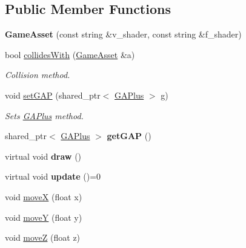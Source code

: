 \subsection*{Public Member Functions}
\begin{DoxyCompactItemize}
\item 
\hypertarget{classGameAsset_ac6d2340f41dd95e71892327dae4e1585}{{\bfseries Game\-Asset} (const string \&v\-\_\-shader, const string \&f\-\_\-shader)}\label{classGameAsset_ac6d2340f41dd95e71892327dae4e1585}

\item 
bool \hyperlink{classGameAsset_a612793ce2a354d2f8839a779d0ca2227}{collides\-With} (\hyperlink{classGameAsset}{Game\-Asset} \&a)
\begin{DoxyCompactList}\small\item\em Collision method. \end{DoxyCompactList}\item 
void \hyperlink{classGameAsset_aa4e2e9faf5cc690677549cbaf30ab80a}{set\-G\-A\-P} (shared\-\_\-ptr$<$ \hyperlink{classGAPlus}{G\-A\-Plus} $>$ g)
\begin{DoxyCompactList}\small\item\em Sets \hyperlink{classGAPlus}{G\-A\-Plus} method. \end{DoxyCompactList}\item 
\hypertarget{classGameAsset_a4d64bc9652249a4d5512b52432b8154a}{shared\-\_\-ptr$<$ \hyperlink{classGAPlus}{G\-A\-Plus} $>$ {\bfseries get\-G\-A\-P} ()}\label{classGameAsset_a4d64bc9652249a4d5512b52432b8154a}

\item 
\hypertarget{classGameAsset_a2d7e18a8f1dd8ba89ed1bd14f2affeab}{virtual void {\bfseries draw} ()}\label{classGameAsset_a2d7e18a8f1dd8ba89ed1bd14f2affeab}

\item 
\hypertarget{classGameAsset_a42688ec8f02e201eaaa01e74a112083f}{virtual void {\bfseries update} ()=0}\label{classGameAsset_a42688ec8f02e201eaaa01e74a112083f}

\item 
void \hyperlink{classGameAsset_a9a3d6f67fb27e862458a02a7a7eb55dd}{move\-X} (float x)
\item 
void \hyperlink{classGameAsset_a5252c2f4119fdc5be9bc8827fb351374}{move\-Y} (float y)
\item 
void \hyperlink{classGameAsset_adfd83d678c0266dfc919bae6b6543495}{move\-Z} (float z)
\end{DoxyCompactItemize}
